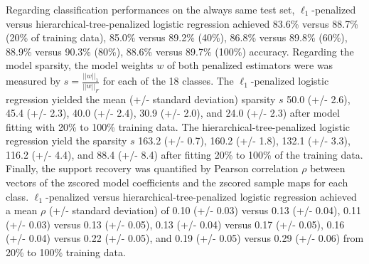 \documentclass{article}
\begin{document}
Regarding classification performances on the always same test set,
$\ell_1$-penalized versus hierarchical-tree-penalized logistic regression
achieved
83.6\% versus 88.7\% (20\% of training data),
85.0\% versus 89.2\% (40\%),
86.8\% versus 89.8\% (60\%),
88.9\% versus 90.3\% (80\%),
88.6\% versus 89.7\% (100\%) accuracy.
Regarding the model sparsity,
the model weights $w$ of both penalized estimators were
was measured by $s = \frac{||w||_1}{||w||_F}$ for each of the 18 classes.
The $\ell_1$-penalized logistic regression
yielded the mean (+/- standard deviation) sparsity $s$ 
50.0 (+/- 2.6), 45.4 (+/- 2.3), 40.0 (+/- 2.4), 30.9 (+/- 2.0), and 24.0 (+/- 2.3)
after model fitting with 20\% to 100\% training data.
The hierarchical-tree-penalized logistic regression
yield the sparsity $s$ 
163.2 (+/- 0.7), 160.2 (+/- 1.8), 132.1 (+/- 3.3), 116.2 (+/- 4.4), and 88.4 (+/- 8.4)
after fitting 20\% to 100\% of the training data.
Finally, the support recovery was quantified by
Pearson correlation $\rho$ between vectors of
the zscored model coefficients
and
the zscored sample maps for each class.
$\ell_1$-penalized versus hierarchical-tree-penalized logistic regression
achieved a mean $\rho$ (+/- standard deviation) of
0.10 (+/- 0.03) versus 0.13 (+/- 0.04),
0.11 (+/- 0.03) versus 0.13 (+/- 0.05),
0.13 (+/- 0.04) versus 0.17 (+/- 0.05),
0.16 (+/- 0.04) versus 0.22 (+/- 0.05), and
0.19 (+/- 0.05) versus 0.29 (+/- 0.06)
from 20\% to 100\% training data.
\end{document}
